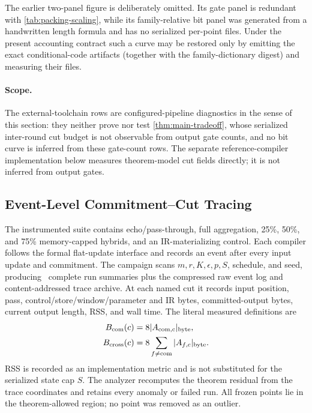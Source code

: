 \documentclass[a4paper,twocolumn,10pt,unpublished]{quantumarticle}
\begin{document}
The earlier two-panel figure is deliberately omitted.  Its gate panel is
redundant with \cref{tab:packing-scaling}, while its family-relative bit panel
was generated from a handwritten length formula and has no serialized
per-point files.  Under the present accounting contract such a curve may be
restored only by emitting the exact conditional-code artifacts (together with
the family-dictionary digest) and measuring their files.

\paragraph{Scope.}
The external-toolchain rows are configured-pipeline diagnostics in the
sense of this section: they neither prove nor test
\cref{thm:main-tradeoff}, whose serialized inter-round cut budget is not
observable from output gate counts, and no bit curve is inferred from these
gate-count rows.  The separate reference-compiler implementation below
measures theorem-model cut fields directly; it is not inferred from output
gates.

\subsection{Event-Level Commitment--Cut Tracing}
\label{sec:cut-tracing}

The instrumented suite contains echo/pass-through, full aggregation, 25\%,
50\%, and 75\% memory-capped hybrids, and an IR-materializing control.  Each
compiler follows the formal flat-update interface and records an event after
every input update and commitment.  The campaign scans $m,r,K,\epsilon,p,S$,
schedule, and seed, producing \TradeoffRuns\ complete run summaries plus the
compressed raw event log and content-addressed trace archive.  At each named
cut it records input position, pass, control/store/window/parameter and IR
bytes, committed-output bytes, current output length, RSS, and wall time.
The literal measured definitions are
\begin{equation*}
\begin{aligned}
 B_{\rm com}(c)&=8|A_{\rm com,c}|_{\rm byte},\\
 B_{\rm cross}(c)&=8\sum_{f\neq\mathrm{com}}|A_{f,c}|_{\rm byte}.
\end{aligned}
\end{equation*}
RSS is recorded as an implementation metric and is not substituted for the
serialized state cap $S$.  The analyzer recomputes the theorem residual from
the trace coordinates and retains every anomaly or failed run.  All frozen
points lie in the theorem-allowed region; no point was removed as an outlier.
\end{document}
